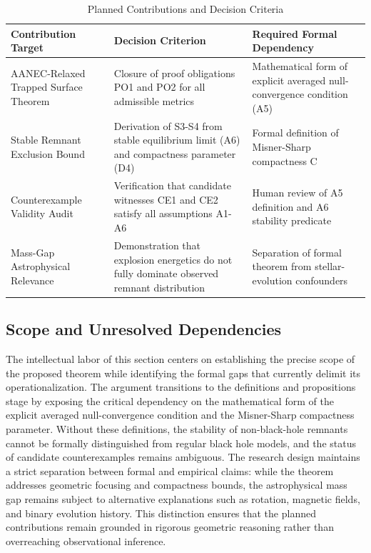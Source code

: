 \documentclass[conference]{IEEEtran}
\begin{document}
\begin{table}[htbp]
\centering
\footnotesize
\setlength{\tabcolsep}{3pt}
\renewcommand{\arraystretch}{1.12}
\caption{Planned Contributions and Decision Criteria}
\label{tab:research-questions-and-contributions-rq-contributions-table}
\begin{tabular}{|p{}|p{}|p{}|}
\hline
Contribution Target & Decision Criterion & Required Formal Dependency \\\hline
AANEC-Relaxed Trapped Surface Theorem & Closure of proof obligations PO1 and PO2 for all admissible metrics & Mathematical form of explicit averaged null-convergence condition (A5) \\\hline
Stable Remnant Exclusion Bound & Derivation of S3-S4 from stable equilibrium limit (A6) and compactness parameter (D4) & Formal definition of Misner-Sharp compactness C \\\hline
Counterexample Validity Audit & Verification that candidate witnesses CE1 and CE2 satisfy all assumptions A1-A6 & Human review of A5 definition and A6 stability predicate \\\hline
Mass-Gap Astrophysical Relevance & Demonstration that explosion energetics do not fully dominate observed remnant distribution & Separation of formal theorem from stellar-evolution confounders \\\hline
\end{tabular}
\end{table}

\subsection{Scope and Unresolved Dependencies}
The intellectual labor of this section centers on establishing the precise scope of the proposed theorem while identifying the formal gaps that currently delimit its operationalization. The argument transitions to the definitions and propositions stage by exposing the critical dependency on the mathematical form of the explicit averaged null-convergence condition and the Misner-Sharp compactness parameter. Without these definitions, the stability of non-black-hole remnants cannot be formally distinguished from regular black hole models, and the status of candidate counterexamples remains ambiguous. The research design maintains a strict separation between formal and empirical claims: while the theorem addresses geometric focusing and compactness bounds, the astrophysical mass gap remains subject to alternative explanations such as rotation, magnetic fields, and binary evolution history. This distinction ensures that the planned contributions remain grounded in rigorous geometric reasoning rather than overreaching observational inference.
\end{document}
